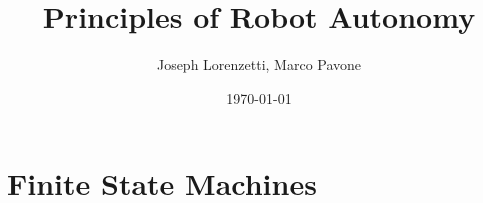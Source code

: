 \documentclass[nohyper,nobib]{tufte-book}
\title{Principles of Robot Autonomy}
\author{Joseph Lorenzetti, Marco Pavone}
\date{\today}
\begin{document}
\chapter{Finite State Machines}


\printbibliography
\end{document}
